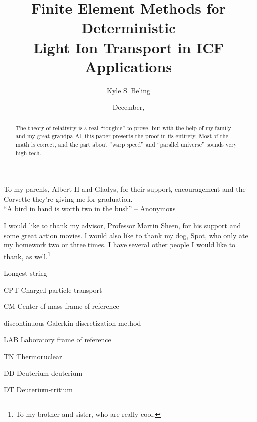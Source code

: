 \title{Finite Element Methods for Deterministic
    \\ Light Ion Transport in ICF Applications}

\author{Kyle S. Beling}





\date{December, \thisyear}

\maketitle

\begin{dedication}
  To my parents, Albert II and Gladys, for their support,
  encouragement and the Corvette they're giving me for graduation. \\[3ex]
  ``A bird in hand is worth two in the bush''
        -- Anonymous
\end{dedication}

\begin{acknowledgments}
    \vspace{1.1in}
    I would like to thank my advisor, Professor Martin Sheen, for his support
    and some great action movies.  I would also like to thank my dog, Spot,
    who only ate my homework two or three times.  I have several other people
    I would like to thank, as well.\footnote{To my brother and sister, who
    are really cool.}
\end{acknowledgments}

\maketitleabstract %

\begin{abstract}
    The theory of relativity is a real ``toughie'' to prove, but with the
    help of my family and my great grandpa Al, this paper presents the
    proof in its entirety.  Most of the math is correct, and the
    part about ``warp speed'' and ``parallel universe'' sounds very high-tech.
\clearpage %
\end{abstract}

\tableofcontents
\listoffigures
\listoftables

\begin{glossary}{Longest  string}
  \item[CPT] Charged particle transport
  \item[CM]  Center of mass frame of reference
  \item[\dG] discontinuous Galerkin discretization method
  \item[LAB] Laboratory frame of reference
  \item[TN]  Thermonuclear
  \item[DD]  Deuterium-deuterium
  \item[DT]  Deuterium-tritium
\end{glossary}